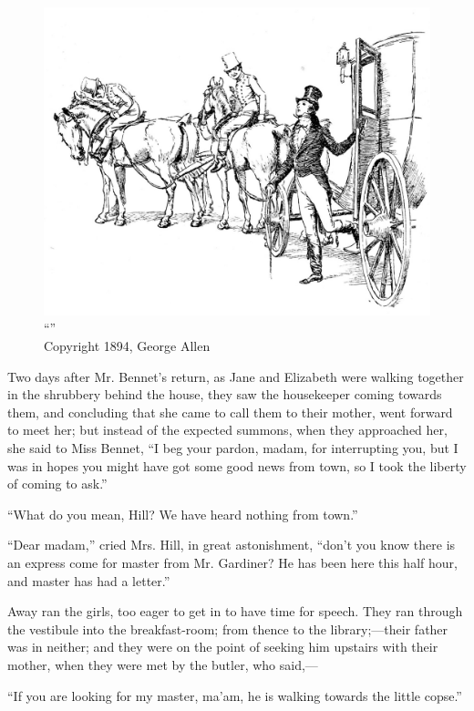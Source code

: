 \begin{figure}[htbp]
    \centering
    \includegraphics[width=\textwidth]{illustrations/i_031.jpg}
    \caption{“”\\ Copyright 1894, George Allen}
    \label{fig:image}
\end{figure}


Two days after Mr. Bennet's return, as Jane and Elizabeth were walking together in the shrubbery behind the house, they saw the housekeeper coming towards them, and concluding that she came to call them to their mother, went forward to meet her; but instead of the expected summons, when they approached her, she said to Miss Bennet, ``I beg your pardon, madam, for interrupting you, but I was in hopes you might have got some good news from town, so I took the liberty of coming to ask.''

``What do you mean, Hill? We have heard nothing from town.''

``Dear madam,'' cried Mrs. Hill, in great astonishment, ``don't you know there is an express come for master from Mr. Gardiner? He has been here this half hour, and master has had a letter.''

Away ran the girls, too eager to get in to have time for speech. They ran through the vestibule into the breakfast-room; from thence to the library;---their father was in neither; and they were on the point of seeking him upstairs with their mother, when they were met by the butler, who said,---

``If you are looking for my master, ma'am, he is walking towards the little copse.''

